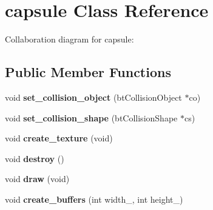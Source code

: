 \hypertarget{classcapsule}{\section{capsule Class Reference}
\label{classcapsule}
}


Collaboration diagram for capsule\+:
\subsection*{Public Member Functions}
\begin{DoxyCompactItemize}
\item 
\hypertarget{classcapsule_abf544e91938afa270d23a5dce652c8b3}{void {\bfseries set\+\_\+collision\+\_\+object} (bt\+Collision\+Object $\ast$co)}\label{classcapsule_abf544e91938afa270d23a5dce652c8b3}

\item 
\hypertarget{classcapsule_aedc1d275c740b4a8d1e340fa01c7097f}{void {\bfseries set\+\_\+collision\+\_\+shape} (bt\+Collision\+Shape $\ast$cs)}\label{classcapsule_aedc1d275c740b4a8d1e340fa01c7097f}

\item 
\hypertarget{classcapsule_a3ef715b222eefb1075dd5446af9a01d5}{void {\bfseries create\+\_\+texture} (void)}\label{classcapsule_a3ef715b222eefb1075dd5446af9a01d5}

\item 
\hypertarget{classcapsule_a4c7d5fed686bd44db66d826b6d92c812}{void {\bfseries destroy} ()}\label{classcapsule_a4c7d5fed686bd44db66d826b6d92c812}

\item 
\hypertarget{classcapsule_a419c56c14f9b4af2e94284b11934d3c7}{void {\bfseries draw} (void)}\label{classcapsule_a419c56c14f9b4af2e94284b11934d3c7}

\item 
\hypertarget{classcapsule_ae201a65574a2722b953d5e073deaab6d}{void {\bfseries create\+\_\+buffers} (int width\+\_\+, int height\+\_\+)}\label{classcapsule_ae201a65574a2722b953d5e073deaab6d}

\end{DoxyCompactItemize}
